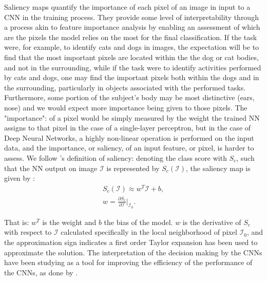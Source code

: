 Saliency maps quantify the importance of each pixel of an image in input to a CNN in the training process. They provide some level of interpretability through a process akin to feature importance analysis by enabling  an assessment of which are the pixels the model relies on the most for the final classification. If the task were, for example, to identify cats and dogs in images, the expectation will be to find that the most important pixels are located within the the dog or cat bodies, and not in the surrounding, while if the task were to identify activities performed by cats and dogs, one may find the important pixels both within the dogs and in the surrounding, particularly in objects associated with the performed tasks. Furthermore, some portion of the subject's body may be most distinctive (ears, nose) and we would expect more importance being given to those pixels. The "importance": of a pixel would be simply measured by the weight the trained NN assigns to that pixel in the case of a single-layer perceptron, but in the case of Deep Neural Networks, a highly non-linear operation is performed on the input data, and the importance, or saliency, of an input feature, or pixel, is harder to assess. We follow \citep{simonyan2014deep}'s definition of saliency: denoting the class score with $S_c$, such that the NN output on image $\mathcal{I}$ is represented by $S_c(\mathcal{I})$, the saliency map is given by :
\begin{eqnarray}
 S_c(\mathcal{I}) \approx w^T \mathcal{I} + b,\\
 w = \frac{\partial S_c}{\partial \mathcal{I}} \biggr\rvert_{\mathcal{I}_0}.
 \end{eqnarray}
 
That is: $w^T$ is the weight and $b$ the bias of the model. $w$ is the derivative of $S_c$ with respect to $\mathcal{I}$ calculated specifically in the local neighborhood of pixel $\mathcal{I}_0$, and the approximation sign indicates a first order Taylor expansion has been used to approximate the solution.
The interpretation of the decision making by the CNNs have been studying as a tool for improving the efficiency of the performance of the CNNs, as done by \citep{DBLP:journals/corr/abs-2105-00937}.


